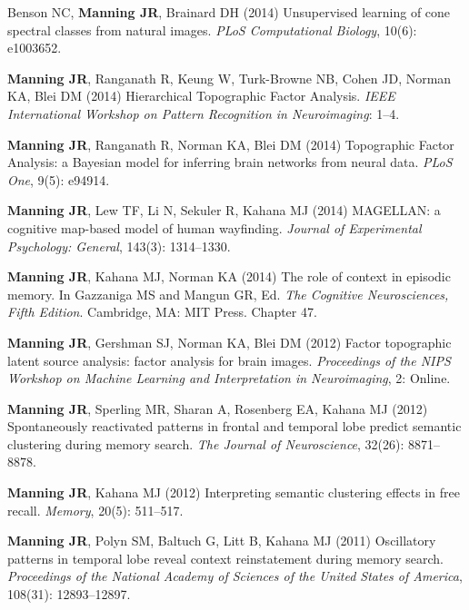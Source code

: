 \documentclass[11pt, a4paper]{article} %
\begin{document}
\begin{etaremune}
\item Benson NC, \textbf{Manning JR}, Brainard DH (2014) Unsupervised learning of cone spectral classes from natural images. \textit{PLoS Computational Biology}, 10(6): e1003652.

\item \textbf{Manning JR}, Ranganath R, Keung W, Turk-Browne NB, Cohen JD, Norman KA, Blei DM (2014) Hierarchical Topographic Factor Analysis. \textit{IEEE International Workshop on Pattern Recognition in Neuroimaging}: 1--4.

\item \textbf{Manning JR}, Ranganath R, Norman KA, Blei DM (2014) Topographic Factor Analysis: a Bayesian model for inferring brain networks from neural data. \textit{PLoS One}, 9(5): e94914.

\item \textbf{Manning JR}, Lew TF, Li N, Sekuler R, Kahana MJ (2014) MAGELLAN: a cognitive map-based model of human wayfinding. \textit{Journal of Experimental Psychology: General}, 143(3): 1314--1330.

\item \textbf{Manning JR}, Kahana MJ, Norman KA (2014) The role of context in episodic memory. In Gazzaniga MS and Mangun GR, Ed. \textit{The Cognitive Neurosciences, Fifth Edition}. Cambridge, MA: MIT Press. Chapter 47.

\item \textbf{Manning JR}, Gershman SJ, Norman KA, Blei DM (2012) Factor topographic latent source analysis: factor analysis for brain images. \textit{Proceedings of the NIPS Workshop on Machine Learning and Interpretation in Neuroimaging}, 2: Online.

\item \textbf{Manning JR}, Sperling MR, Sharan A, Rosenberg EA, Kahana MJ (2012) Spontaneously reactivated patterns in frontal and temporal lobe predict semantic clustering during memory search. \textit{The Journal of Neuroscience}, 32(26): 8871--8878.

\item \textbf{Manning JR}, Kahana MJ (2012) Interpreting semantic clustering effects in free recall. \textit{Memory}, 20(5): 511--517.

\item \textbf{Manning JR}, Polyn SM, Baltuch G, Litt B, Kahana MJ (2011) Oscillatory patterns in temporal lobe reveal context reinstatement during memory search. \textit{Proceedings of the National Academy of Sciences of the United States of America}, 108(31): 12893--12897.


\end{etaremune}
\end{document}
